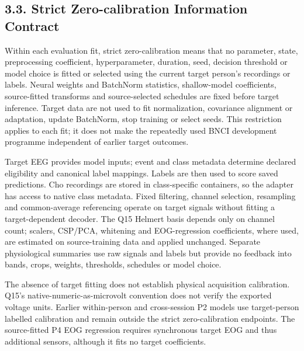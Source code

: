\documentclass[11pt]{article}
\begin{document}
\subsection*{3.3. Strict Zero-calibration Information Contract}
Within each evaluation fit, strict zero-calibration means that no parameter, state, preprocessing coefficient, hyperparameter, duration, seed, decision threshold or model choice is fitted or selected using the current target person's recordings or labels. Neural weights and BatchNorm statistics, shallow-model coefficients, source-fitted transforms and source-selected schedules are fixed before target inference. Target data are not used to fit normalization, covariance alignment or adaptation, update BatchNorm, stop training or select seeds. This restriction applies to each fit; it does not make the repeatedly used BNCI development programme independent of earlier target outcomes.

Target EEG provides model inputs; event and class metadata determine declared eligibility and canonical label mappings. Labels are then used to score saved predictions. Cho recordings are stored in class-specific containers, so the adapter has access to native class metadata. Fixed filtering, channel selection, resampling and common-average referencing operate on target signals without fitting a target-dependent decoder. The Q15 Helmert basis depends only on channel count; scalers, CSP/PCA, whitening and EOG-regression coefficients, where used, are estimated on source-training data and applied unchanged. Separate physiological summaries use raw signals and labels but provide no feedback into bands, crops, weights, thresholds, schedules or model choice.

The absence of target fitting does not establish physical acquisition calibration. Q15's native-numeric-as-microvolt convention does not verify the exported voltage units. Earlier within-person and cross-session P2 models use target-person labelled calibration and remain outside the strict zero-calibration endpoints. The source-fitted P4 EOG regression requires synchronous target EOG and thus additional sensors, although it fits no target coefficients.
\end{document}
